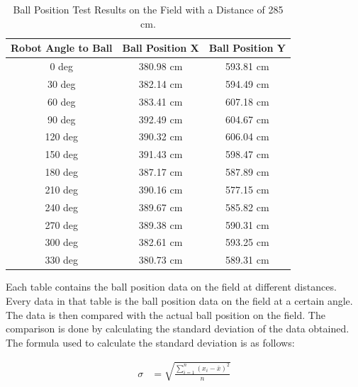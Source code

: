 \begin{table}[htbp]
\caption{Ball Position Test Results on the Field with a Distance of 285 cm.}
\begin{center}

\begin{tabular}{|c|c|c|}
  \hline
  \rowcolor[HTML]{C0C0C0}
  \textbf{Robot Angle to Ball} & \textbf{Ball Position X} & \textbf{Ball Position Y} \\
  \hline
  0 deg            & 380.98 cm                & 593.81 cm            \\
  30 deg           & 382.14 cm                & 594.49 cm            \\
  60 deg           & 383.41 cm                & 607.18 cm            \\
  90 deg           & 392.49 cm                & 604.67 cm           \\
  120 deg           & 390.32 cm                & 606.04 cm           \\
  150 deg           & 391.43 cm                & 598.47 cm           \\
  180 deg           & 387.17 cm                & 587.89 cm           \\
  210 deg           & 390.16 cm                & 577.15 cm           \\
  240 deg           & 389.67 cm                & 585.82 cm           \\
  270 deg           & 389.38 cm                & 590.31 cm           \\
  300 deg           & 382.61 cm                & 593.25 cm           \\
  330 deg           & 380.73 cm                & 589.31 cm           \\
  \hline
\end{tabular}
\end{center}
\end{table}

Each table contains the ball position data on the field at different distances. Every data in that table is the ball position data on the field at a certain angle. The data is then compared with the actual ball position on the field. The comparison is done by calculating the standard deviation of the data obtained. The formula used to calculate the standard deviation is as follows: 

\begin{equation}
  \begin{aligned}
    \sigma &= \sqrt{\frac{\sum_{i=1}^{n} (x_i - \bar{x})^2}{n}} \\ 
  \end{aligned}
\end{equation}

